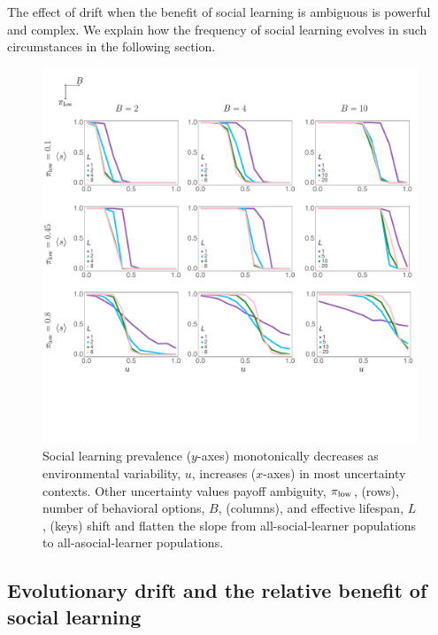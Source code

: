 \documentclass[letterpaper,11.5pt]{scrartcl}
\newcommand{\cm}[1]{{\textcolor{mypurple} {({\tiny CM:} #1)}}}
\begin{document}
The effect of drift when the benefit of social learning is ambiguous is powerful and complex. We explain how the frequency of social learning evolves in such circumstances in the following section.



\begin{figure}
  \caption{Social learning prevalence ($y$-axes) monotonically decreases as 
  environmental variability, $u$, increases ($x$-axes) in most uncertainty contexts. 
  Other uncertainty values payoff ambiguity, $\pi_{\mathrm{low}}$, (rows), number of behavioral options, $B$, (columns), and effective lifespan, $L$, (keys) shift and flatten the slope from all-social-learner populations to all-asocial-learner
  populations.}
  \label{fig:mainResults}
  \centering
    \includegraphics[width=\textwidth]{Figures/mainResultsPlots.pdf}
\end{figure}

\subsection{Evolutionary drift and the relative benefit of social learning}
\end{document}
